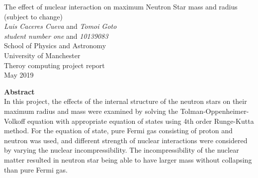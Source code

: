 \documentclass[11pt]{article}
\begin{document}
\begin{titlepage}
\begin{center}
{\Huge The effect of nuclear interaction on maximum Neutron Star mass and radius (subject to change)  }\\[0.5cm]
\textit{Luis Caceres Cueva} and \textit{Tomoi Goto}~\\[0.3cm]
\textit{student number one} and \textit{10139083}~\\[0.3cm]
School of Physics and Astronomy~\\[0.3cm]
University of Manchester~\\[0.3cm]
Theroy computing project report~\\[0.3cm]
May 2019~\\[2cm]

\end{center}
{\Large \textbf{Abstract}}~\\[0.3cm]
In this project, the effects of the internal structure of the neutron stars on their maximum radius and mass were examined by solving the Tolman-Oppenheimer-Volkoff equation with appropriate equation of states using 4th order Runge-Kutta method. For the equation of state, pure Fermi gas consisting of proton and neutron was used, and different strength of nuclear interactions were considered by varying the nuclear incompressibility. The incompressibility of the nuclear matter resulted in neutron star being able to have larger mass without collapsing than pure Fermi gas.
\end{titlepage}
\clearpage
{}
\setcounter{page}{2}

\newpage

\end{document}
